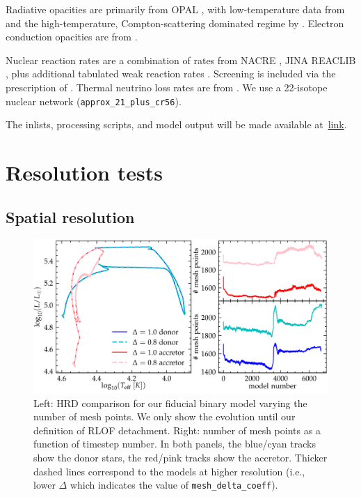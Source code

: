 \documentclass[twocolumn,twocolappendix,trackchanges]{aastex63}
\begin{document}
Radiative opacities are primarily from OPAL \citep{Iglesias1993,
  Iglesias1996}, with low-temperature data from \citet{Ferguson2005}
and the high-temperature, Compton-scattering dominated regime by
\citet{Buchler1976}. Electron conduction opacities are from
\citet{Cassisi2007}.

Nuclear reaction rates are a combination of rates from NACRE
\citep{Angulo1999}, JINA REACLIB \citep{Cyburt2010}, plus additional
tabulated weak reaction rates \citet{Fuller1985, Oda1994,
  Langanke2000}. Screening is included via the prescription of
\citet{Chugunov2007}.  Thermal neutrino loss rates are from
\citet{Itoh1996}. We use a
22-isotope nuclear network (\texttt{approx\_21\_plus\_cr56}).

The inlists, processing scripts, and model output will be made available at~\href{link}{link}.


\section{Resolution tests}
\label{sec:res_tests}
\subsection{Spatial resolution}

\begin{figure}[htbp]
  \centering
  \includegraphics[width=\textwidth]{spatial_res_plot}
  \caption{Left: HRD comparison for our fiducial binary model varying
  the number of mesh points. We only show the evolution until our definition
  of RLOF detachment. Right: number of mesh points as a
  function of timestep number. In both panels, the blue/cyan tracks show the donor stars, the
red/pink tracks show the accretor. Thicker dashed lines correspond to
the models at higher resolution (i.e., lower $\Delta$ which indicates
the value of \texttt{mesh\_delta\_coeff}).}
\end{figure}




\end{document}

